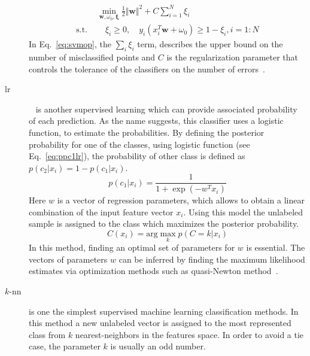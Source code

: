 \begin{description}
\begin{align}
 & \min\limits_{\mathbf{w},\omega_{0}, \mathbf{\xi}} \frac{1}{2} \Vert \mathbf{w} \Vert^{2} + C \sum\limits_{i = 1}^{N} \xi_{i} \nonumber \\ 
\text{s.t. } & \quad \xi_{i} \geq 0, \quad y_{i}(x_{i}^{T}\mathbf{w} + \omega_{0}) \geq 1 - \xi_{i}, i = 1:N 
\label{eq:svmop}
\end{align}
In Eq.~\ref{eq:svmop}, the $\sum_{i} \xi_{i}$ term, describes the upper bound on the number of misclassified points and $C$ is the regularization parameter that controls the tolerance of the classifiers on the number of errors~\cite{murphy2012machine}. \\

\item[\acl{lr}]~\cite{cox1958regression} is another supervised learning which can provide associated probability of each prediction.
As the name suggests, this classifier uses a logistic function, to estimate the probabilities.
By defining the posterior probability for one of the classes, using logistic function (see Eq.~\ref{eq:ppc1lr}), the probability of other class is defined as $p(c_{2}|x_{i}) = 1 - p(c_{1}|x_{i})$.
\begin{equation} \label{eq:ppc1lr}
p(c_{1}|x_{i}) = \frac{1}{1+\exp(-w^{T}x_{i})}
\end{equation}
\noindent Here $w$ is a vector of regression parameters, which allows to obtain a linear combination of the input feature vector $x_{i}$.
Using this model the unlabeled sample is assigned to the class which maximizes the posterior probability. 
\begin{equation}
C(x_{i}) =  \text{arg}\max\limits_{k} p(C = k| x_{i})
\end{equation}
In this method, finding an optimal set of parameters for $w$ is essential.
The vectors of parameters $w$ can be inferred by finding the maximum likelihood estimates via optimization methods such as quasi-Newton method~\cite{byrd1994representations}.\\
 
\item[$k$-\acl{nn}] is one the simplest supervised machine learning classification methods.
In this method a new unlabeled vector is assigned to the most represented class from $k$ nearest-neighbors in the features space.
In order to avoid a tie case, the parameter $k$ is usually an odd number.

\end{description}




